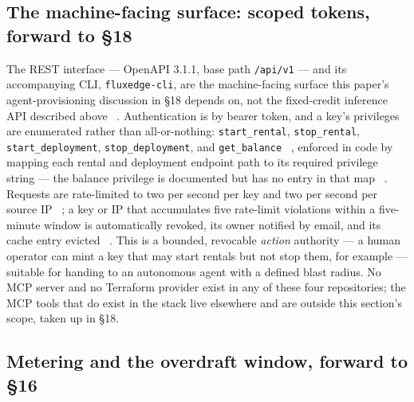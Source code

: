 \subsection{The machine-facing surface: scoped tokens, forward to \S18}
\label{sec:accelerated-compute-machine-facing}

The \FluxEdge REST interface — OpenAPI 3.1.1, base path \texttt{/api/v1} — and its accompanying CLI,
\texttt{fluxedge-cli}, are the machine-facing surface this paper's agent-provisioning discussion in
\S18 depends on, not the fixed-credit inference API described above \shipped\ .
Authentication is by bearer token, and a key's privileges are enumerated rather than all-or-nothing:
\texttt{start\_rental}, \texttt{stop\_rental}, \texttt{start\_deployment}, \texttt{stop\_deployment},
and \texttt{get\_balance} \shipped\ ,
enforced in code by mapping each rental and deployment endpoint path to its required privilege
string --- the balance privilege is documented but has no entry in that map
\shipped\ . Requests are rate-limited to two per
second per key and two per second per source IP \shipped\ ;
a key or IP that accumulates five rate-limit violations within a five-minute window is automatically
revoked, its owner notified by email, and its cache entry evicted \shipped\ .
This is a bounded, revocable \emph{action} authority — a human operator can mint a key that may start
rentals but not stop them, for example — suitable for handing to an autonomous agent with a defined
blast radius. No MCP server and no Terraform provider exist in any of these four repositories; the
MCP tools that do exist in the \Flux stack live elsewhere and are outside this section's scope, taken
up in \S18.

\subsection{Metering and the overdraft window, forward to \S16}
\label{sec:accelerated-compute-metering}

